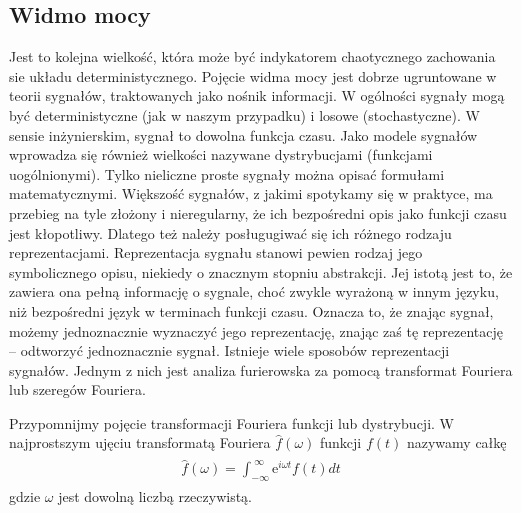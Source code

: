 \documentclass[a4paper,12pt,polish]{sphinxmanual}
\begin{document}
\subsection{Widmo mocy}
\label{ch2/chII012:widmo-mocy}
Jest to kolejna wielkość, która może być indykatorem chaotycznego zachowania sie układu deterministycznego. Pojęcie widma mocy jest dobrze ugruntowane w teorii sygnałów, traktowanych jako nośnik informacji. W ogólności sygnały mogą być deterministyczne (jak w naszym przypadku) i losowe (stochastyczne). W sensie inżynierskim, sygnał to dowolna funkcja czasu.  Jako modele sygnałów wprowadza się również wielkości nazywane dystrybucjami (funkcjami uogólnionymi). Tylko  nieliczne proste sygnały można opisać formułami matematycznymi.  Większość sygnałów, z jakimi spotykamy się w praktyce, ma przebieg na tyle złożony i nieregularny, że ich bezpośredni opis  jako funkcji czasu jest kłopotliwy.  Dlatego też należy posługugiwać się  ich różnego rodzaju reprezentacjami. Reprezentacja sygnału stanowi pewien rodzaj jego symbolicznego opisu, niekiedy o znacznym stopniu abstrakcji. Jej istotą jest to, że zawiera ona pełną informację o sygnale, choć zwykle wyrażoną w innym języku, niż bezpośredni język  w terminach funkcji czasu.  Oznacza to, że znając sygnał, możemy jednoznacznie wyznaczyć jego reprezentację, znając zaś tę reprezentację – odtworzyć jednoznacznie sygnał. Istnieje wiele sposobów reprezentacji sygnałów. Jednym z nich jest analiza furierowska za pomocą transformat Fouriera lub szeregów Fouriera.

Przypomnijmy pojęcie transformacji Fouriera funkcji lub dystrybucji. W najprostszym ujęciu transformatą  Fouriera ${\hat f}(\omega)$  funkcji $f(t)$ nazywamy całkę
\label{ch2/chII012:equation-eqn20}\begin{gather}
\begin{split}{\hat f}(\omega) = \int_{-\infty}^{\; \infty}  \mbox{e}^{i \omega t} f(t)  dt\end{split}\label{ch2/chII012-eqn20}
\end{gather}
gdzie $\omega$ jest dowolną liczbą rzeczywistą.
\end{document}
